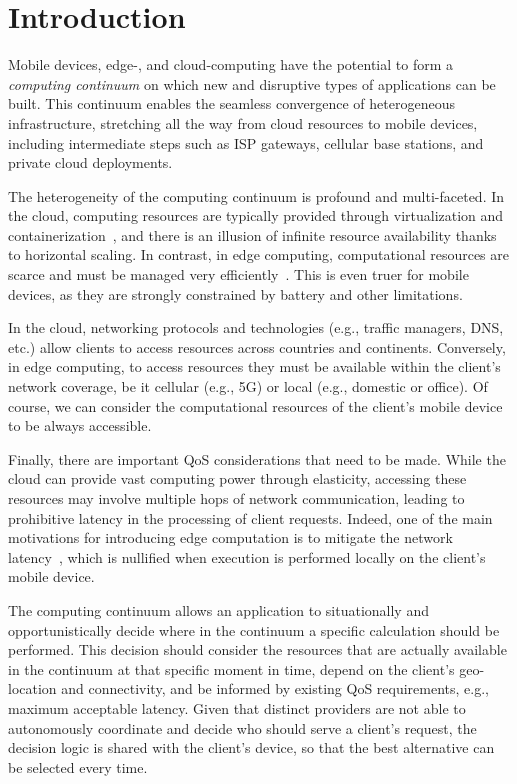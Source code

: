 \section{Introduction}
\label{sec:intro}

Mobile devices, edge-, and cloud-computing have the potential to form a \textit{computing continuum} on which new and disruptive types of applications can be built. This continuum enables the seamless convergence of heterogeneous infrastructure, stretching all the way from cloud resources to mobile devices, including intermediate steps such as ISP gateways, cellular base stations, and private cloud deployments.

The heterogeneity of the computing continuum is profound and multi-faceted. In the cloud, computing resources are typically provided through virtualization and containerization~\cite{leitner2016patterns, Quatrocchi2016discrete}, and there is an illusion of infinite resource availability thanks to horizontal scaling. In contrast, in edge computing, computational resources are scarce and must be managed very efficiently~\cite{Shi:2016, GarrigaMendonca2017}. This is even truer for mobile devices, as they are strongly constrained by battery and other limitations. 

In the cloud, networking protocols and technologies (e.g., traffic managers, DNS, etc.) allow clients to access resources across countries and continents. Conversely, in edge computing, to access resources they must be available within the client's network coverage, be it cellular (e.g., 5G) or local (e.g., domestic or office). Of course, we can consider the computational resources of the client's mobile device to be always accessible. %

Finally, there are important QoS considerations that need to be made. While the cloud can provide vast computing power through elasticity, accessing these resources may involve multiple hops of network communication, leading to prohibitive latency in the processing of client requests. Indeed, one of the main motivations for introducing edge computation is to mitigate the network latency~\cite{Shi:2016}, which is nullified when execution is performed locally on the client's mobile device.

The computing continuum allows an application to situationally and opportunistically decide where in the continuum a specific calculation should be performed. This decision should consider the resources that are actually available in the continuum at that specific moment in time, depend on the client's geo-location and connectivity, and be informed by existing QoS requirements, e.g., maximum acceptable latency. Given that distinct providers are not able to autonomously coordinate and decide who should serve a client's request, the decision logic is shared with the client's device, so that the best alternative can be selected every time.

